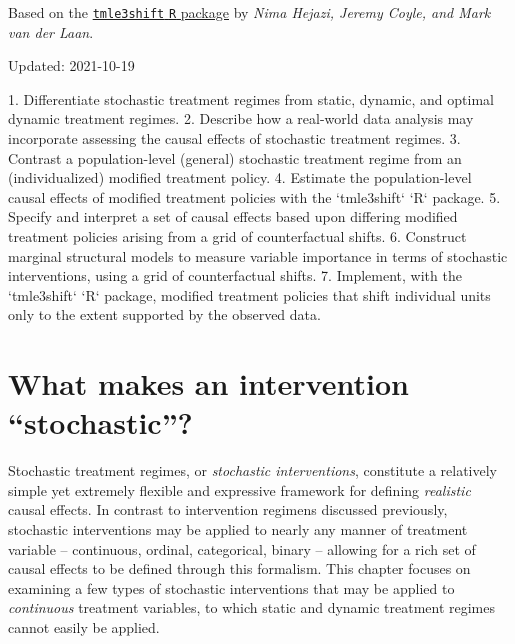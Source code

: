 \documentclass[
  12pt, krantz2,
]{krantz}
\newcommand{\passthrough}[1]{#1}
\theoremstyle{definition}
\theoremstyle{definition}
\theoremstyle{definition}
\newcommand{\1}{\mathbbm{1}}
\begin{document}
Based on the \href{https://github.com/tlverse/tmle3shift}{\passthrough{\lstinline!tmle3shift!} \passthrough{\lstinline!R!} package}
by \emph{Nima Hejazi, Jeremy Coyle, and Mark van der Laan}.

Updated: 2021-10-19

\begin{VT1}



1. Differentiate stochastic treatment regimes from static, dynamic, and optimal
   dynamic treatment regimes.
2. Describe how a real-world data analysis may incorporate assessing the causal
   effects of stochastic treatment regimes.
3. Contrast a population-level (general) stochastic treatment regime from an
   (individualized) modified treatment policy.
4. Estimate the population-level causal effects of modified treatment policies
   with the `tmle3shift` `R` package.
5. Specify and interpret a set of causal effects based upon differing modified
   treatment policies arising from a grid of counterfactual shifts.
6. Construct marginal structural models to measure variable importance in terms
   of stochastic interventions, using a grid of counterfactual shifts.
7. Implement, with the `tmle3shift` `R` package, modified treatment policies
   that shift individual units only to the extent supported by the observed
   data.

\end{VT1}

\hypertarget{what-makes-an-intervention-stochastic}{%
\section{What makes an intervention ``stochastic''?}\label{what-makes-an-intervention-stochastic}}

Stochastic treatment regimes, or \emph{stochastic interventions}, constitute a
relatively simple yet extremely flexible and expressive framework for defining
\emph{realistic} causal effects. In contrast to intervention regimens discussed
previously, stochastic interventions may be applied to nearly any manner of
treatment variable -- continuous, ordinal, categorical, binary -- allowing for a
rich set of causal effects to be defined through this formalism. This chapter
focuses on examining a few types of stochastic interventions that may be applied
to \emph{continuous} treatment variables, to which static and dynamic treatment
regimes cannot easily be applied.
\end{document}
